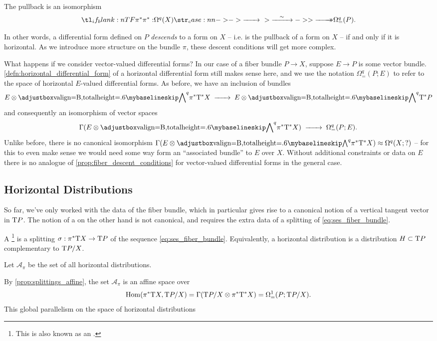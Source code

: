 \begin{proposition}\label{prop:fiber_descent_conditions}
  The pullback is an isomorphism
  \[
    \lkxfunc{\pi^*}{\Omega^q(X)}{\Omega^q_=(P).}
  \]
\end{proposition}

In other words, a differential form defined on $P$ \emph{descends} to a form on $X$ -- i.e. is the pullback of a form on $X$ -- if and only if it is horizontal. As we introduce more structure on the bundle $\pi$, these descent conditions will get more complex.

What happens if we consider vector-valued differential forms? 
In our case of a fiber bundle $P\to X$, suppose $E\to P$ is some vector bundle. \cref{defn:horizontal_differential_form} of a horizontal differential form still makes sense here, and we use the notation $\Omega^q_=(P; E)$ to refer to the space of horizontal $E$-valued differential forms. As before, we have an inclusion of bundles
\[
    E\otimes \alt^q \pi^* \T^\d X \lkxto E\otimes \alt^q \T^\d P
\]
and consequently an isomorphism of vector spaces
\[
    \Gamma(E\otimes \alt^q \pi^* \T^\d X) \lkxto \Omega^q_=(P; E).
\]
Unlike before, there is no canonical isomorphism $\Gamma(E\otimes \alt^q \pi^* \T^\d X)\cong \Omega^q(X; ?)$ -- for this to even make sense we would need some way form an ``associated bundle'' to $E$ over $X$. Without additional constraints or data on $E$ there is no analogue of \cref{prop:fiber_descent_conditions} for vector-valued differential forms in the general case.

\subsection{Horizontal Distributions}

So far, we've only worked with the data of the fiber bundle, which in particular gives rise to a canonical notion of a vertical tangent vector in $\mathrm{T} P$. The notion of a  on the other hand is not canonical, and requires the extra data of a splitting of \cref{eq:ses_fiber_bundle}.
\begin{definition}
  A \footnote{This is also known as an .}
  is a splitting $\sigma : \pi^*\mathrm{T} X \to \mathrm{T} P$ of the sequence \cref{eq:ses_fiber_bundle}. Equivalently, a horizontal distribution is a distribution $H\subset \mathrm{T} P$ complementary to $\mathrm{T} P/X$.
\end{definition}
Let $\mathcal{A}_\pi$ be the set of all horizontal distributions. 
\begin{remark}\label{rmk:hor_distr_affine}
  By \cref{prop:splittings_affine}, the set $\mathcal{A}_\pi$ is an affine space over 
\[
  \operatorname{Hom}(\pi^* \mathrm{T} X, \mathrm{T} P /X) = \Gamma(\mathrm{T} P/X \otimes \pi^* \mathrm{T}^* X) = \Omega^1_=(P; \mathrm{T} P /X).
\]
This global parallelism on the space of horizontal distributions 
\end{remark}

